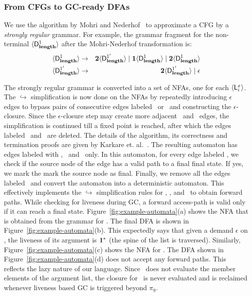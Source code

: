 \documentclass[preprint,9pt]{sigplanconf}
\begin{document}
\subsubsection{From CFGs to GC-ready DFAs}
\label{sec:NFA-approx}
 We use  the algorithm by Mohri  and Nederhof~\cite{mohri00regular} to
 approximate a CFG by a {\em strongly regular\/} grammar.  For
 example, the grammar
 fragment  for  the  non-terminal  $\langle \mathsf{D}_{\mathit {\mathbf{length}}}^{1}\rangle$  after  the
 Mohri-Nederhof transformation is:
 \begin{eqnarray*}
   \langle \mathsf{D}_{\mathit {\mathbf{length}}}^{1}\rangle &\rightarrow& {\mathbf{2}}\langle \mathsf{D}_{\mathit {\mathbf{length}}}^{1'}\rangle \mid
   \mathbf{1}\langle \mathsf{D}_{\mathit {\mathbf{length}}}^{1}\rangle
   \mid {\mathbf{2}}\langle \mathsf{D}_{\mathit {\mathbf{length}}}^{1}\rangle\\
   \langle \mathsf{D}_{\mathit {\mathbf{length}}}^{1'}\rangle &\rightarrow& {\mathbf{2}}\langle \mathsf{D}_{\mathit {\mathbf{length}}}^{1'}\rangle
   \mid \epsilon
 \end{eqnarray*}

The strongly regular grammar is converted  into a set of NFAs, one for
each $\langle \mathsf{L}_{{i}}^{x}\rangle$.  The $\hookrightarrow$ simplification is now
done on the NFAs by  repeatedly introducing $\epsilon$ edges to bypass
pairs  of consecutive  edges labeled  \bcar\acar\ or  \bcdr\acdr\ and
constructing the $\epsilon$-closure. Since the $\epsilon$-closure step
may  create  more  adjacent  \bcar\acar\ and  \bcdr\acdr\  edges,  the
simplification is continued till a fixed point is reached, after which
the edges labeled \bcar \ and  \bcdr\ are deleted.  The details of the
algorithm, its correctness and termination proofs are given by Karkare
et.  al.~\cite{karkare07liveness,asati14lgc}.  The resulting automaton
has  edges labeled  with  \acar,  \acdr\ and  \clazy\  only. In  this
automaton, for every edge labeled \clazy, we check if the source node
of the edge has a valid path to  a final final state.  If yes, we mark
the mark  the source node as  final. Finally, we remove  all the edges
labeled  \clazy\  and  convert  the automaton  into  a  deterministic
automaton.    This   effectively  implements   the   $\hookrightarrow$
simplification rules for  \bcar, \bcdr, and \clazy\  to obtain forward
paths. While  checking for liveness  during GC, a  forward access-path
is valid only if it can reach a final state. 
Figure~\ref{fig:example-automata}(a)  shows the  NFA that  is obtained
from the grammar for .  The final DFA is shown in
Figure~\ref{fig:example-automata}(b).  This expectedly says that given
a  demand $\epsilon$  on  \length,  the liveness  of  its argument  is
$\mathbf{1}^{*}$  (the  spine  of   the  list  is  traversed).   Similarly,
Figure~\ref{fig:example-automata}(c)     shows     the     NFA     for
.          The         DFA         shown         in
Figure~\ref{fig:example-automata}(d)  does  not   accept  any  forward
paths.   This  reflects  the  lazy  nature  of  our  language.   Since
\length\ does not  evaluate the member elements of  the argument list,
the  closure for  \pa\ is  never evaluated  and is  reclaimed whenever
liveness based GC is triggered beyond $\pi_9$.
\end{document}
